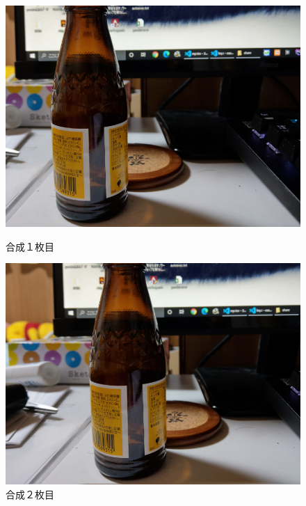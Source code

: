 \documentclass[11pt]{jarticle}
\begin{document}
\begin{figure}[ht]
  \begin{minipage}{0.5\hsize}
    \centering
    \includegraphics[scale=.3]{3-3.jpg}
    \caption{合成１枚目}
    \label{3-3.jpg}
  \end{minipage}
  \begin{minipage}{0.5\hsize}
    \centering
    \includegraphics[scale=.3]{3-4.jpg}
    \caption{合成２枚目}
    \label{3-4.jpg}
  \end{minipage}
\end{figure}
\end{document}
